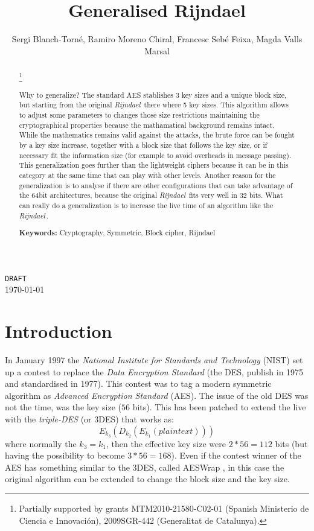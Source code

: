 \documentclass[10pt,a4paper,twoside]{llncs}
\title{Generalised Rijndael}
\author{Sergi Blanch-Torn\'e\inst{1}, Ramiro Moreno Chiral\inst{2}, Francesc Seb\'e Feixa\inst{2}, Magda Valls Marsal\inst{2}}
\institute{
 Escola Polit\`ecnica Superior, Universitat de Lleida. Spain.\\
 \email{\tt sblanch@alumnes.udl.es}
 \and 
 Departament de Matem\`atica. Universitat de Lleida. Spain.\\
 \email{\tt \{ramiro,fsebe,magda\}@matematica.udl.es}
 }
\newcommand{\rijndael}{\emph{Rijndael}}
\begin{document}
\maketitle
\begin{center}
 {\tt DRAFT}\\
 \today\\
\end{center}

\begin{abstract}\footnote{Partially supported by grants MTM2010-21580-C02-01 (Spanish Ministerio de Ciencia e Innovaci\'on), 2009SGR-442 (Generalitat de Catalunya).}

Why to generalize? The standard AES stablishes 3 key sizes and a unique block size, but starting from the original \rijndael\, there where 5 key sizes. This algorithm allows to adjust some parameters to changes those size restrictions maintaining the cryptographical properties because the mathamatical background remains intact. While the mathematics remains valid against the attacks, the brute force can be fought by a key size increase, together with a block size that follows the key size, or if necessary fit the information size (for example to avoid overheads in message passing). This generalization goes further than the lightweight ciphers because it can be in this category at the same time that can play with other levels.
Another reason for the generalization is to analyse if there are other configurations that can take advantage of the $64$bit architectures, because the original \rijndael\, fits very well in $32$ bits.
What can really do a generalization is to increase the live time of an algorithm like the \rijndael\,.

{\bf Keywords:} Cryptography, Symmetric, Block cipher, Rijndael
\end{abstract}

\section{Introduction}\label{sec:intro}

In January 1997 the \emph{National Institute for Standards and Technology} (NIST) set up a contest to replace the \emph{Data Encryption Standard} (the DES, publish in 1975 and standardised in 1977). This contest was to tag a modern symmetric algorithm as \emph{Advanced Encryption Standard} (AES). The issue of the old DES was not the time, was the key size ($56$ bits). This has been patched to extend the live with the \emph{triple-DES} (or 3DES) that works as:
\begin{equation}\label{eq:3DES}
    E_{k_3}(D_{k_2}(E_{k_1}(plaintext)))
\end{equation}
where normally the $k_3=k_1$, then the effective key size were $2*56=112$ bits (but having the possibility to become $3*56=168$). Even if the contest winner of the AES has something similar to the 3DES, called AESWrap \cite{rfc3394}, in this case the original algorithm can be extended to change the block size and the key size.
\end{document}
